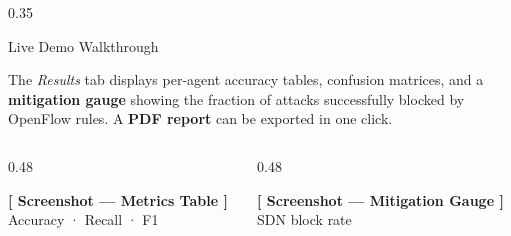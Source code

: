 \documentclass[final]{beamer}
\begin{document}
\begin{frame}[t]
\begin{columns}[T,totalwidth=\textwidth]
\begin{column}{0.35\textwidth}
\begin{block}{Live Demo Walkthrough}
\begin{tcolorbox}[demobox,
  title={\large\raisebox{1pt}{\textbf{\textsf{④}}}~Result Evaluation}]
\large
The \textit{Results} tab displays per-agent
accuracy tables, confusion matrices, and a
\textbf{mitigation gauge} showing the fraction
of attacks successfully blocked by OpenFlow rules.
A \textbf{PDF report} can be exported in one click.

\vspace{0.4cm}
\begin{columns}[T]
  \begin{column}{0.48\textwidth}
    \begin{tcolorbox}[screenshot, height=10cm]
      \textbf{[ Screenshot — Metrics Table ]}\\[4pt]
      Accuracy · Recall · F1
    \end{tcolorbox}
  \end{column}
  \hfill
  \begin{column}{0.48\textwidth}
    \begin{tcolorbox}[screenshot, height=10cm]
      \textbf{[ Screenshot — Mitigation Gauge ]}\\[4pt]
      SDN block rate
    \end{tcolorbox}
  \end{column}
\end{columns}
\end{tcolorbox}

\end{block}

\end{column}

\end{columns}

\end{frame}
\end{document}
